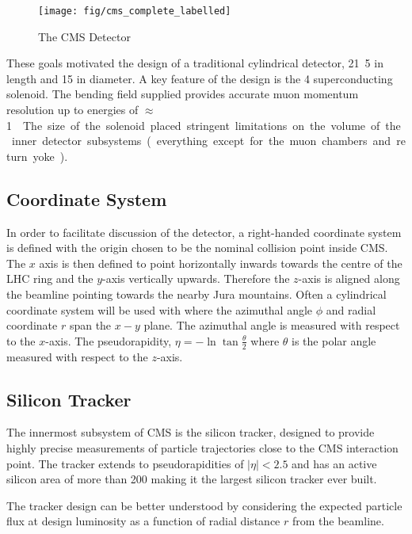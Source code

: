 \begin{figure}
\texttt{[image: fig/cms\_complete\_labelled]}
\caption{The CMS Detector}
\end{figure}

These goals motivated the design of a traditional cylindrical detector,
\unit{21.5}{\metre} in length and \unit{15}{\metre} in diameter. A key feature
of the design is the \unit{4}{\tesla} superconducting solenoid. The bending
field supplied provides accurate muon momentum resolution up to energies of
\unit{$\approx$ 1}{\TeV}. The size of the solenoid placed stringent
limitations on the volume of the inner detector subsystems (everything except
for the muon chambers and return yoke).

\subsection{Coordinate System}
In order to facilitate discussion of the detector, a right-handed coordinate
system is defined with the origin chosen to be the nominal collision point
inside \ac{CMS}. The $x$ axis is then defined to point horizontally inwards
towards the centre of the \ac{LHC} ring and the $y$-axis vertically
upwards. Therefore the $z$-axis is aligned along the beamline pointing towards
the nearby Jura mountains. Often a cylindrical coordinate system will be used
with where the azimuthal angle $\phi$ and radial coordinate $r$ span the $x-y$
plane. The azimuthal angle is measured with respect to the $x$-axis. The
pseudorapidity, $\eta = - \ln \tan \frac{\theta}{2}$ where $\theta$ is the polar
angle measured with respect to the $z$-axis.

\subsection{Silicon Tracker}
The innermost subsystem of \ac{CMS} is the silicon tracker, designed to provide
highly precise measurements of particle trajectories close to the CMS
interaction point. The tracker extends to pseudorapidities of $|\eta|<2.5$ and
has an active silicon area of more than \unit{200}{\metre\squared} making it the
largest silicon tracker ever built.

The tracker design can be better understood by considering the expected particle
flux at design luminosity as a function of radial distance $r$ from the
beamline.

